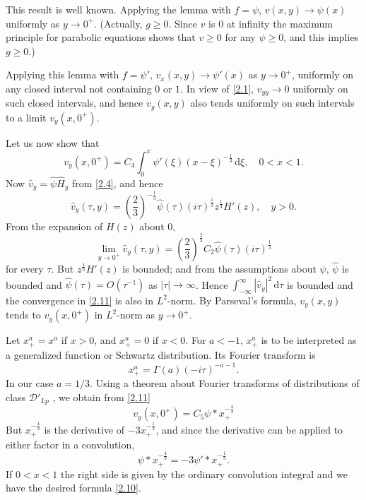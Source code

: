 \documentclass[leqno]{article}
\numberwithin{equation}{section}
\theoremstyle{plain}
\newcommand{\dd}{\,\mathrm{d}}
\begin{document}
This result is well known.
Applying the lemma with $f = \psi$, $v(x,y)\to\psi(x)$ uniformly as $y \to 0^+$.
(Actually, $g \geq 0$. Since $v$ is $0$ at infinity the maximum principle for parabolic equations shows that $v \geq 0$ for any $\psi \geq 0$, and this implies $g \geq 0.$)

Applying this lemma with $f = \psi'$, $v_x(x,y)\to\psi'(x)$ as $y \to 0^+$, uniformly on any closed interval not containing $0$ or $1$.
In view of \eqref{2.1}, $v_{yy}\to 0$ uniformly on such closed intervals, and hence $v_y(x,y)$ also tends uniformly on such intervals to a limit $v_y(x,0^+)$.

Let us now show that
\begin{equation}
	\label{2.10}
	v_y(x,0^+) = C_4 \int_0^x \psi'(\xi) (x-\xi)^{-\frac 1 3} \dd \xi,
	\quad 0 < x < 1.
\end{equation}
Now $\hat{v}_y = \hat{\psi}\hat{H}_y$ from \eqref{2.4}, and hence
\begin{equation*}
	\hat{v}_y(\tau,y) = \left(\frac 23\right)^{-\frac 1 3} \hat{\psi}(\tau) (i\tau)^{\frac 1 3} z^{\frac 13} H'(z), 
	\quad y > 0.
\end{equation*}
From the expansion of $H(z)$ about $0$,
\begin{equation}
	\label{2.11}
	\lim_{y\to0^+} \hat{v}_y(\tau,y) = \left(\frac 2 3\right)^{\frac 2 3} C_2 \hat{\psi}(\tau) (i\tau)^{\frac 13}
\end{equation}
for every $\tau$. 
But $z^{\frac 13} H'(z)$ is bounded; and from the assumptions about $\psi$, $\hat{\psi}$ is bounded and $\hat{\psi}(\tau) = O(\tau^{-1})$ as $|\tau|\to\infty$.
Hence $\int_{-\infty}^{\infty} |\hat{v}_y|^2\dd\tau$ is bounded and the convergence in \eqref{2.11} is also in $L^2$-norm.
By Parseval's formula, $v_y(x,y)$ tends to $v_y(x,0^+)$ in $L^2$-norm as $y\to0^+$.

Let $x_+^a = x^a$ if $x > 0$, and $x_+^a = 0$ if $x < 0$.
For $a < -1$, $x_+^a$ is to be interpreted as a generalized function or Schwartz distribution.
Its Fourier transform is
\begin{equation*}
	\widehat{x_+^a} = \Gamma(a) (-i\tau)^{-a-1}.
\end{equation*}
In our case $a = 1/3$.
Using a theorem about Fourier transforms of distributions of class $\mathcal{D}'_{Lp}$ \cite[p.\ 57, 126]{S}, we obtain from \eqref{2.11}
\begin{equation*}
	v_y(x,0^+) = C_5 \psi * x_+^{-\frac 4 3}
\end{equation*}
But $x_+^{-\frac 4 3}$ is the derivative of $-3x_+^{-\frac 1 3}$, and since the derivative can be applied to either factor in a convolution,
\begin{equation*}
	\psi * x_+^{-\frac 4 3} = - 3 \psi' * x_+^{-\frac 1 3}.
\end{equation*}
If $0 < x < 1$ the right side is given by the ordinary convolution integral and we have the desired formula \eqref{2.10}.
\end{document}
